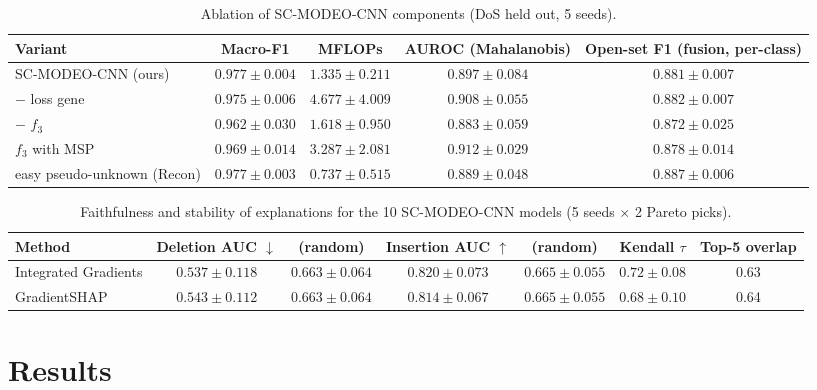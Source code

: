 \documentclass[10pt,twocolumn,letterpaper]{article}
\begin{document}
\begin{table}[t]\centering\small
\caption{Ablation of SC-MODEO-CNN components (DoS held out, 5 seeds).}\label{tab:ablation}
\begin{tabular}{lcccc}\toprule
Variant & Macro-F1 & MFLOPs & AUROC (Mahalanobis) & Open-set F1 (fusion, per-class)\\\midrule
SC-MODEO-CNN (ours) & $0.977 \pm 0.004$ & $1.335 \pm 0.211$ & $0.897 \pm 0.084$ & $0.881 \pm 0.007$\\
$-$ loss gene & $0.975 \pm 0.006$ & $4.677 \pm 4.009$ & $0.908 \pm 0.055$ & $0.882 \pm 0.007$\\
$-$ $f_3$ & $0.962 \pm 0.030$ & $1.618 \pm 0.950$ & $0.883 \pm 0.059$ & $0.872 \pm 0.025$\\
$f_3$ with MSP & $0.969 \pm 0.014$ & $3.287 \pm 2.081$ & $0.912 \pm 0.029$ & $0.878 \pm 0.014$\\
easy pseudo-unknown (Recon) & $0.977 \pm 0.003$ & $0.737 \pm 0.515$ & $0.889 \pm 0.048$ & $0.887 \pm 0.006$\\\bottomrule
\end{tabular}
\end{table}

\begin{table}[t]\centering\small
\caption{Faithfulness and stability of explanations for the 10 SC-MODEO-CNN models (5 seeds $\times$ 2 Pareto picks).}\label{tab:xai}
\begin{tabular}{lcccccc}\toprule
Method & Deletion AUC $\downarrow$ & (random) & Insertion AUC $\uparrow$ & (random) & Kendall $\tau$ & Top-5 overlap\\\midrule
Integrated Gradients & $0.537 \pm 0.118$ & $0.663 \pm 0.064$ & $0.820 \pm 0.073$ & $0.665 \pm 0.055$ & $0.72 \pm 0.08$ & 0.63\\
GradientSHAP & $0.543 \pm 0.112$ & $0.663 \pm 0.064$ & $0.814 \pm 0.067$ & $0.665 \pm 0.055$ & $0.68 \pm 0.10$ & 0.64\\\bottomrule
\end{tabular}
\end{table}




\section{Results}\label{sec:results}
\end{document}
